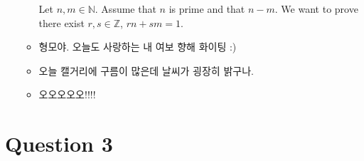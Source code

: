 \documentclass[12pt]{article}
\begin{document}
\begin{enumerate}[a.]
\begin{itemize}
        \begin{mdframed}
            Let $n, m \in \mathbb{N}$. Assume that $n$ is prime and that $n - m$.
            We want to prove there exist $r, s \in \mathbb{Z}$, $rn + sm = 1$.

        \end{mdframed}
        \item 형모야. 오늘도 사랑하는 내 여보 향해 화이팅 :)
        \item 오늘 캘거리에 구름이 많은데 날씨가 굉장히 밝구나.
        \item 오오오오오!!!!
    \end{itemize}

\end{enumerate}

\section*{Question 3}
\end{document}
